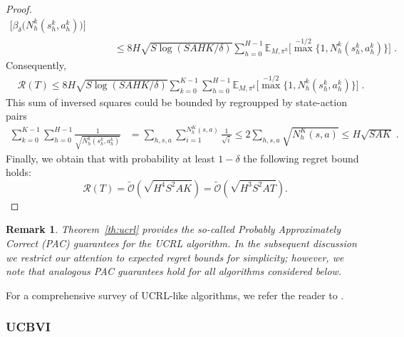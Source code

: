 \documentclass{article}
\numberwithin{equation}{section}
\newtheorem{remark}{Remark}
\newcommand{\eqsp}{\;}
\begin{document}
\begin{proof}
{\begin{align*}
    \big[
        \beta_\delta\big(N_h^k(s_h^k,a_h^k)\big) 
    \big] \\
    &\qquad\leq
    8H\sqrt{S\log(SAHK/\delta)}
    \sum_{h=0}^{H-1}
    \mathbb E_{M,\pi^k}
       \big[{\max}^{-1/2}\{1,N_h^k(s_h^k,a_h^k)\}\big]
    \eqsp.
\end{align*}
Consequently,
\begin{align*}
    &\mathcal R(T)
    \leq
    8H\sqrt{S\log(SAHK/\delta)}
    \sum_{k=0}^{K-1}\sum_{h=0}^{H-1}
    \mathbb E_{M,\pi^k}
        \big[{\max}^{-1/2}\{1,N_h^k(s_h^k,a_h^k)\}\big]\eqsp.
\end{align*}} 
This sum of inversed squares could be bounded by regroupped by state-action pairs
    \begin{align*}
        \sum_{k=0}^{K-1} \sum_{h=0}^{H-1} \frac{1}{\sqrt{N^k_h(s_h^k,a^k_h)}} &= \sum_{h,s,a}\sum_{i=1}^{N_h^K(s,a)}\frac{1}{\sqrt{i}} \leq 2\sum_{h,s,a}\sqrt{N_h^K(s,a)} \leq H\sqrt{SAK}\eqsp.
    \end{align*}
    Finally, we obtain that with probability at least $1-\delta$ the following regret bound holds:
    \[
        \mathcal{R}(T) = \widetilde{\mathcal{O}}(\sqrt{H^4 S^2 A K} ) = \widetilde{\mathcal{O}}(\sqrt{H^3 S^2 A T}).
    \]
\end{proof}
\begin{remark}
    Theorem~\ref{th:ucrl} provides the so-called \emph{Probably Approximately Correct} (PAC) guarantees for the UCRL algorithm. In the subsequent discussion we restrict our attention to \emph{expected regret} bounds for simplicity;  however, we note that analogous PAC guarantees hold for all algorithms considered below.
\end{remark}
For a comprehensive survey of UCRL-like algorithms, we refer the reader to \cite{neu2020unifying}.
\subsubsection{UCBVI}
\end{document}
